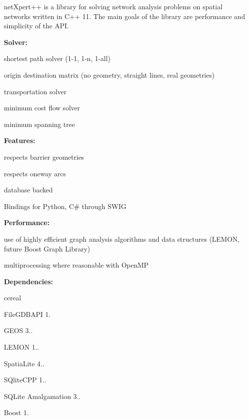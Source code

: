 net\+Xpert++ is a library for solving network analysis problems on spatial networks written in C++ 11. The main goals of the library are performance and simplicity of the A\+PI.

{\bfseries Solver\+:} 
\begin{DoxyItemize}
\item shortest path solver (1-\/1, 1-\/n, 1-\/all)
\item origin destination matrix (no geometry, straight lines, real geometries)
\item transportation solver
\item minimum cost flow solver
\item minimum spanning tree
\end{DoxyItemize}

{\bfseries Features\+:} 
\begin{DoxyItemize}
\item respects barrier geometries
\item respects oneway arcs
\item database backed
\item Bindings for Python, C\# through S\+W\+IG
\end{DoxyItemize}

{\bfseries Performance\+:} 
\begin{DoxyItemize}
\item use of highly efficient graph analysis algorithms and data structures (L\+E\+M\+ON, future Boost Graph Library)
\item multiprocessing where reasonable with Open\+MP
\end{DoxyItemize}

{\bfseries Dependencies\+:} 
\begin{DoxyItemize}
\item cereal
\item File\+G\+D\+B\+A\+PI 1.
\item G\+E\+OS 3..
\item L\+E\+M\+ON 1..
\item Spatia\+Lite 4..
\item S\+Qlite\+C\+PP 1..
\item S\+Q\+Lite Amalgamation 3..
\item Boost 1. 
\end{DoxyItemize}